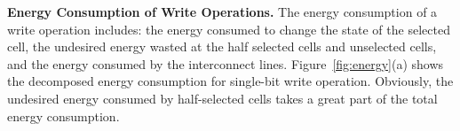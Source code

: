\vspace{3pt}\noindent\textbf{Energy Consumption of Write Operations.}
%
The energy consumption of a write operation includes: the energy consumed
to change the state of the selected cell, the undesired energy wasted at
the half selected cells and unselected cells, and the energy consumed by
the interconnect lines.
Figure~\ref{fig:energy}(a) shows the decomposed energy consumption for
single-bit write operation. Obviously, the undesired energy consumed by
half-selected cells takes a great part of the total energy consumption.
